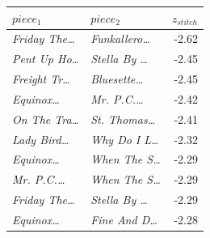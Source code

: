 \begin{tabular}{llr}
\toprule
$piece_1$ & $piece_2$ & $z_{stitch}$ \\
\midrule
\textit{Friday The\dots} & \textit{Funkallero\dots} & -2.62 \\
\textit{Pent Up Ho\dots} & \textit{Stella By \dots} & -2.45 \\
\textit{Freight Tr\dots} & \textit{Bluesette\dots} & -2.45 \\
\textit{Equinox\dots} & \textit{Mr. P.C.\dots} & -2.42 \\
\textit{On The Tra\dots} & \textit{St. Thomas\dots} & -2.41 \\
\textit{Lady Bird\dots} & \textit{Why Do I L\dots} & -2.32 \\
\textit{Equinox\dots} & \textit{When The S\dots} & -2.29 \\
\textit{Mr. P.C.\dots} & \textit{When The S\dots} & -2.29 \\
\textit{Friday The\dots} & \textit{Stella By \dots} & -2.29 \\
\textit{Equinox\dots} & \textit{Fine And D\dots} & -2.28 \\
\bottomrule
\end{tabular}
